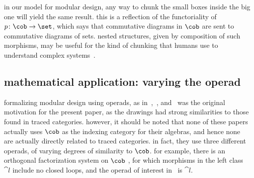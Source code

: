 \documentclass[11pt,oneside,article]{memoir}
\begin{document}
in our model for modular design, any way to chunk the small boxes inside the big one will yield the
same result. this is a reflection of the functoriality of $p\colon\cob\to\set$, which says that
commutative diagrams in $\cob$ are sent to commutative diagrams of sets. nested structures, given
by composition of such morphisms, may be useful for the kind of chunking that humans use to
understand complex systems~\cite{miller}.

\subsection{mathematical application: varying the operad}\label{subsec:math_application}

formalizing modular design using operads, as in~\cite{spivak},~\cite{rupelspivak},
and~\cite{vagnerspivaklerman} was the original motivation for the present paper, as the drawings had
strong similarities to those found in traced categories. however, it should be noted that none of
these papers actually uses $\cob$ as the indexing category for their algebras, and hence none are
actually directly related to traced categories. in fact, they use three different operads, of
varying degrees of similarity to $\cob$. for example, there is an orthogonal factorization system on
$\cob$ \cite{abadi}, for which morphisms in the left class $\cat{l}$ include no closed loops, and
the operad of interest in~\cite{vagnerspivaklerman} is $\cat{l}$.
\end{document}
